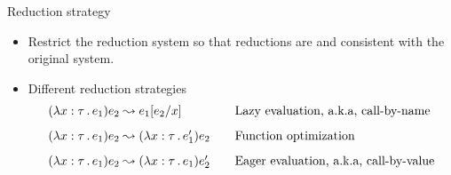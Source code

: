\documentclass[paper=screen,mode=present,style=zysimple]{powerdot}
\begin{document}
\begin{slide}{Reduction strategy}
\begin{itemize}
\item Restrict the reduction system so that reductions are  and consistent with 
  the original system. 
\item Different reduction strategies
\[
\begin{array}{l@{\qquad}l}
(\lambda x: \tau \ldot e_1) e_2 \reduce e_1 [e_2 / x] 
& \mbox{Lazy evaluation, a.k.a, call-by-name} \\[0.8em]
(\lambda x: \tau \ldot e_1) e_2 \reduce (\lambda x: \tau \ldot e_1') e_2 
& \mbox{Function optimization} \\[0.8em]
(\lambda x: \tau \ldot e_1) e_2 \reduce (\lambda x: \tau \ldot e_1) e_2'
& \mbox{Eager evaluation, a.k.a, call-by-value}
\end{array}
\]
\end{itemize}
\end{slide}
\end{document}
